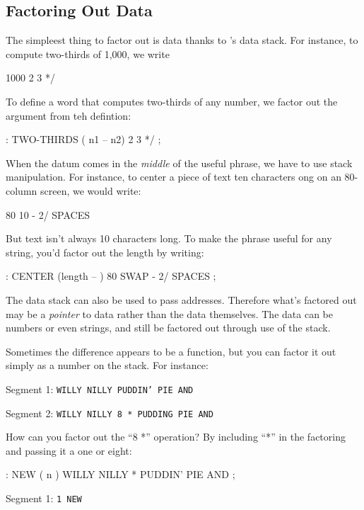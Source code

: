 \subsection{{Factoring Out Data}}
The simpleest thing to factor out is data thanks to \Forth{}'s data stack. For instance, to compute two-thirds of 1,000, we write

\begin{Code}
1000 2 3 */
\end{Code}
To define a word that computes two-thirds of any number, we factor out the argument from teh defintion:

\begin{Code}
: TWO-THIRDS  ( n1 -- n2)  2 3 */ ;
\end{Code}
When the datum comes in the \emph{middle} of the useful phrase, we have to use stack manipulation. For instance, to center a piece of text ten characters ong on an 80-column screen, we would write:

\begin{Code}
80  10 -  2/ SPACES
\end{Code}
But text isn't always 10 characters long. To make the phrase useful for any string, you'd factor out the length by writing:

\begin{Code}
: CENTER (length -- ) 80 SWAP - 2/ SPACES ;
\end{Code}
The data stack can also be used to pass addresses. Therefore what's factored out may be a \emph{pointer} to data rather than the data themselves. The data can be numbers or even strings, and still be factored out through use of the stack.
	
Sometimes the difference appears to be a function, but you can factor it out simply as a number on the stack. For instance:

\bigskip

Segment 1:	\texttt{WILLY NILLY  PUDDIN' PIE AND}

Segment 2:	\texttt{WILLY NILLY  8 * PUDDING PIE AND}

\bigskip

\noindent
How can you factor out the ``8 *'' operation? By including ``*'' in the factoring and passing it a one or eight:

\begin{Code}
: NEW  ( n )  WILLY NILLY * PUDDIN' PIE AND ;
\end{Code}

Segment 1:    \texttt{1 NEW}

